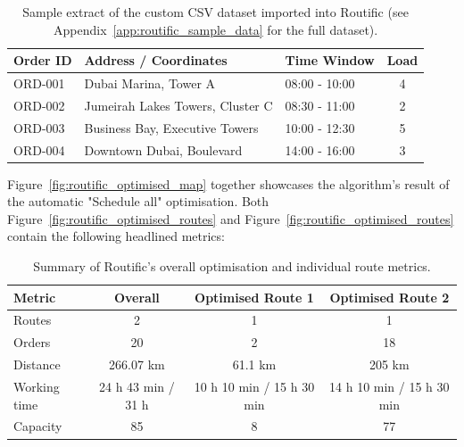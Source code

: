 \documentclass[11pt]{article}
\begin{document}
\begin{table}[H]
\centering
\small
\begin{tabular}{@{}lllc@{}}
\toprule
\textbf{Order ID} & \textbf{Address / Coordinates} & \textbf{Time Window} & \textbf{Load} \\ \midrule
ORD-001 & Dubai Marina, Tower A & 08:00 - 10:00 & 4 \\
ORD-002 & Jumeirah Lakes Towers, Cluster C & 08:30 - 11:00 & 2 \\
ORD-003 & Business Bay, Executive Towers & 10:00 - 12:30 & 5 \\
ORD-004 & Downtown Dubai, Boulevard & 14:00 - 16:00 & 3 \\ \bottomrule
\end{tabular}
\caption{Sample extract of the custom CSV dataset imported into Routific (see Appendix~\ref{app:routific_sample_data} for the full dataset).}
\label{tab:csv_sample}
\end{table}

Figure~\ref{fig:routific_optimised_map} together showcases the algorithm's result of the automatic "Schedule all" optimisation. Both Figure~\ref{fig:routific_optimised_routes} and Figure~\ref{fig:routific_optimised_routes} contain the following headlined metrics: 
\begin{table}[H]
\centering
\small
\begin{tabular}{@{}lccc@{}}
\toprule
\textbf{Metric} & \textbf{Overall} & \textbf{Optimised Route 1} & \textbf{Optimised Route 2} \\ \midrule
Routes       & 2                   & 1                            & 1                            \\
Orders       & 20                  & 2                            & 18                           \\
Distance     & 266.07 km           & 61.1 km                      & 205 km                       \\
Working time & 24 h 43 min / 31 h  & 10 h 10 min / 15 h 30 min    & 14 h 10 min / 15 h 30 min    \\
Capacity & 85                & 8                            & 77                           \\ \bottomrule
\end{tabular}
\caption{Summary of Routific's overall optimisation and individual route metrics.}
\label{tab:routific_route_metrics}
\end{table}
\end{document}
